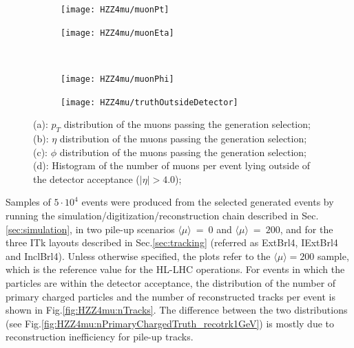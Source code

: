 \documentclass[a4paper,twoside,12pt]{book}
\begin{document}
\begin{figure}
\begin{subfigure}{.5\linewidth}
\texttt{[image: HZZ4mu/muonPt]}
\caption{}
\label{fig:HZZ4mu:pt}
\end{subfigure}
\begin{subfigure}{.5\linewidth}
\centering
\texttt{[image: HZZ4mu/muonEta]}
\caption{}
\label{fig:HZZ4mu:eta}
\end{subfigure}\\[1 ex]
\begin{subfigure}{.5\linewidth}
\centering
\texttt{[image: HZZ4mu/muonPhi]}
\caption{}
\label{fig:HZZ4mu:phi}
\end{subfigure}
\begin{subfigure}{.5\linewidth}
\centering
\texttt{[image: HZZ4mu/truthOutsideDetector]}
\caption{}
\label{fig:HZZ4mu:truthOutsideDetector}
\end{subfigure}
\caption{(a): $p_T$ distribution of the muons passing the generation selection;\\
	        (b): $\eta$ distribution of the muons passing the generation selection;\\
        	        (c): $\phi$ distribution of the muons passing the generation selection;\\
         	        (d): Histogram of the number of muons per event lying outside of the detector acceptance
         	        	($|\eta| > 4.0$);\\
        	        }
\label{fig:HZZ4mu:muonKinematics}
\end{figure}

Samples of $5 \cdot 10^4$ events were produced from the selected generated events by running
the simulation/digitization/reconstruction chain described in Sec.\ref{sec:simulation}, in
two pile-up scenarios  $\langle\mu\rangle\ =\ 0$ and $\langle\mu\rangle\ =\ 200$, and for the three ITk layouts described in Sec.\ref{sec:tracking} 
(referred as ExtBrl4, IExtBrl4 and InclBrl4). Unless otherwise specified, the plots refer to the $\langle\mu\rangle = 200$ sample, which is the reference
value for the HL-LHC operations. For events in which the particles are within the detector acceptance, the distribution of
the number of primary charged particles and the number of reconstructed tracks per event is shown in
Fig.\ref{fig:HZZ4mu:nTracks}. The difference between the two distributions (see Fig.\ref{fig:HZZ4mu:nPrimaryChargedTruth_recotrk1GeV}) is
mostly due to reconstruction inefficiency for pile-up tracks.
\end{document}

